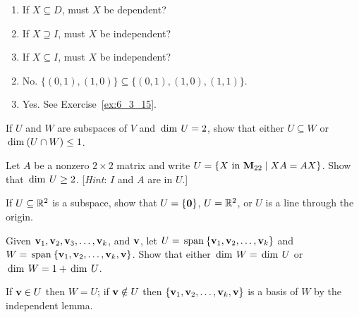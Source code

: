 \begin{multicols}{2}
\begin{ex}
\begin{enumerate}[label={\alph*.}]
\item If $X \subseteq D$, must $X$ be dependent?

\item If $X \supseteq I$, must $X$ be independent?

\item If $X \subseteq I$, must $X$ be independent?

\end{enumerate}
\begin{sol}
\begin{enumerate}[label={\alph*.}]
\setcounter{enumi}{1}
\item  No. $\{(0, 1), (1, 0)\} \subseteq \{(0, 1), (1, 0), (1, 1)\}$.

\setcounter{enumi}{3}
\item  Yes. See Exercise~\ref{ex:6_3_15}.

\end{enumerate}
\end{sol}
\end{ex}

\begin{ex}
If $U$ and $W$ are subspaces of $V$ and $\thinspace\operatorname{dim\medspace} U = 2$, show that either $U \subseteq W$ or $\thinspace\operatorname{dim\medspace}(U \cap W) \leq 1$.
\end{ex}

\begin{ex}
Let $A$ be a nonzero $2 \times 2$ matrix and write $U = \{X \mbox{ in } \textbf{M}_{22} \mid XA = AX\}$. Show that $\thinspace\operatorname{dim\medspace} U \geq 2$. [\textit{Hint}: $I$ and $A$ are in $U$.]
\end{ex}

\begin{ex}
If $U \subseteq \mathbb{R}^2$ is a subspace, show that $U = \{\textbf{0}\}$, $U = \mathbb{R}^2$, or $U$ is a line through the origin.
\end{ex}

\begin{ex}
Given $\textbf{v}_{1}, \textbf{v}_{2}, \textbf{v}_{3}, \dots, \textbf{v}_{k}$, and $\textbf{v}$, let $U = \thinspace\operatorname{span\medspace}\{\textbf{v}_{1}, \textbf{v}_{2}, \dots, \textbf{v}_{k}\}$ and $W = \thinspace\operatorname{span\medspace}\{\textbf{v}_{1}, \textbf{v}_{2}, \dots, \textbf{v}_{k}, \textbf{v}\}$. Show that either $\thinspace\operatorname{dim\medspace} W = \thinspace\operatorname{dim\medspace} U$ or $\thinspace\operatorname{dim\medspace} W = 1 + \thinspace\operatorname{dim\medspace} U$.

\begin{sol}
If $\textbf{v} \in U$ then $W = U$; if $\textbf{v} \notin U$ then $\{\textbf{v}_{1}, \textbf{v}_{2}, \dots, \textbf{v}_{k}, \textbf{v}\}$ is a basis of $W$ by the independent lemma.
\end{sol}
\end{ex}


\end{multicols}
